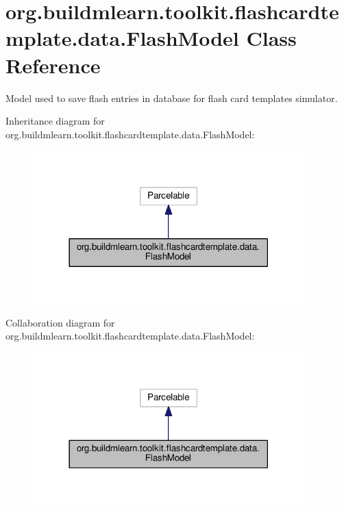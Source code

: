 \hypertarget{classorg_1_1buildmlearn_1_1toolkit_1_1flashcardtemplate_1_1data_1_1FlashModel}{}\section{org.\+buildmlearn.\+toolkit.\+flashcardtemplate.\+data.\+Flash\+Model Class Reference}
\label{classorg_1_1buildmlearn_1_1toolkit_1_1flashcardtemplate_1_1data_1_1FlashModel}


Model used to save flash entries in database for flash card template\textquotesingle{}s simulator.  




Inheritance diagram for org.\+buildmlearn.\+toolkit.\+flashcardtemplate.\+data.\+Flash\+Model\+:
\nopagebreak
\begin{figure}[H]
\begin{center}
\leavevmode
\includegraphics[width=297pt]{classorg_1_1buildmlearn_1_1toolkit_1_1flashcardtemplate_1_1data_1_1FlashModel__inherit__graph}
\end{center}
\end{figure}


Collaboration diagram for org.\+buildmlearn.\+toolkit.\+flashcardtemplate.\+data.\+Flash\+Model\+:
\nopagebreak
\begin{figure}[H]
\begin{center}
\leavevmode
\includegraphics[width=297pt]{classorg_1_1buildmlearn_1_1toolkit_1_1flashcardtemplate_1_1data_1_1FlashModel__coll__graph}
\end{center}
\end{figure}

